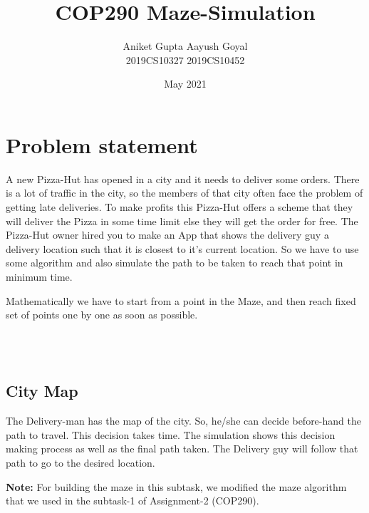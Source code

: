 \documentclass{article}
\title{COP290 Maze-Simulation}
\date{May 2021}
\author{Aniket Gupta \hspace{2cm}  Aayush Goyal \\
    2019CS10327 \hspace{2.3cm} 2019CS10452}
\begin{document}
\maketitle

\section{Problem statement}
A new Pizza-Hut has opened in a city and it needs to deliver some orders. There is a lot of traffic in the city, so the members of that city often face the problem of getting late deliveries. To make profits this Pizza-Hut offers a scheme that they will deliver the Pizza in some time limit else they will get the order for free. The Pizza-Hut owner hired you to make an App that shows the delivery guy a delivery location such that it is closest to it's current location. So we have to use some algorithm and also simulate the path to be taken to reach that point in minimum time.
\\
\par Mathematically we have to start from a point in the Maze, and then reach fixed set of points one by one as soon as possible.

\\\\
\subsection{City Map} 

\begin{figure}[H]
     \centering
\end{figure}
The Delivery-man has the map of the city. So, he/she can decide before-hand the path to travel. This decision takes time. The simulation shows this decision making process as well as the final path taken. The Delivery guy will follow that path to go to the desired location.
\\
\par
\textbf{Note:} For building the maze in this subtask, we modified the maze algorithm that we used in the subtask-1 of Assignment-2 (COP290).
\end{document}
